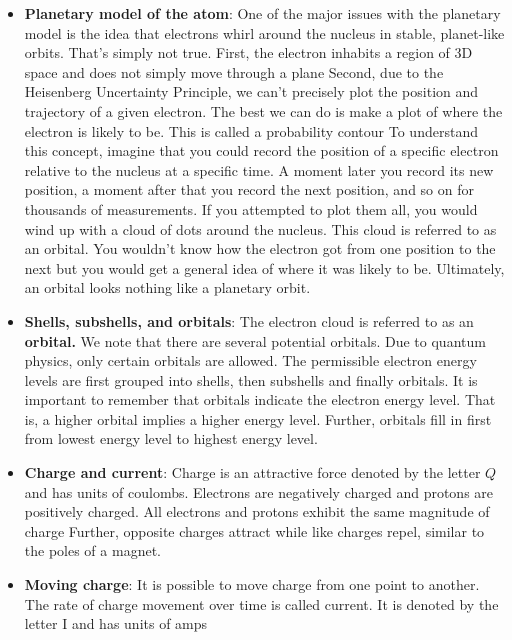 \documentclass{report}
\begin{document}
    \begin{itemize}
        \item \textbf{Planetary model of the atom}: One of the major issues with the planetary model is the idea that electrons whirl around the nucleus in stable, planet-like orbits. That's simply not true. First, the electron inhabits a region of 3D space and does not simply move through a plane       
            \bigbreak \noindent 
            Second, due to the Heisenberg Uncertainty Principle, we can't precisely plot the position and trajectory of a given electron. The best we can do is make a plot of where the electron is likely to be. This is called a probability contour
            \bigbreak \noindent 
            To understand this concept, imagine that you could record the position of a specific electron relative to the nucleus at a specific time. A moment later you record its new position, a moment after that you record the next position, and so on for thousands of measurements. If you attempted to plot them all, you would wind up with a cloud of dots around the nucleus. This cloud is referred to as an orbital. You wouldn't know how the electron got from one position to the next but you would get a general idea of where it was likely to be. Ultimately, an orbital looks nothing like a planetary orbit.
        \item \textbf{Shells, subshells, and orbitals}: The electron cloud is referred to as an \textbf{orbital.}
            \bigbreak \noindent 
            We note that there are several potential orbitals. Due to quantum physics, only certain orbitals are allowed. The permissible electron energy levels are first grouped into shells, then subshells and finally orbitals. It is important to remember that orbitals indicate the electron energy level. That is, a higher orbital implies a higher energy level. Further, orbitals fill in first from lowest energy level to highest energy level.
        \item \textbf{Charge and current}: Charge is an attractive force denoted by the letter $Q$ and has units of coulombs.
            \bigbreak \noindent 
            Electrons are negatively charged and protons are positively charged. All electrons and protons exhibit the same magnitude of charge
            \bigbreak \noindent 
            Further, opposite charges attract while like charges repel, similar to the poles of a magnet.
        \item \textbf{Moving charge}: It is possible to move charge from one point to another. The rate of charge movement over time is called current. It is denoted by the letter I and has units of amps

\end{itemize}
\end{document}
